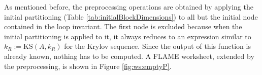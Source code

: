 %
%
%

As mentioned before, the preprocessing operations are obtained by applying the initial partitioning (Table \ref{tab:initialBlockDimensions}) to all but the initial node contained in the loop invariant. The first node is excluded because when the initial partitioning is applied to it, it always reduces to an expression similar to $k_R := \text{KS} \left(A, k_R \right)$ for the Krylov sequence. Since the output of this function is already known, nothing has to be computed. A FLAME worksheet, extended by the preprocessing, is shown in Figure \ref{fig:ws:emptyP}.

